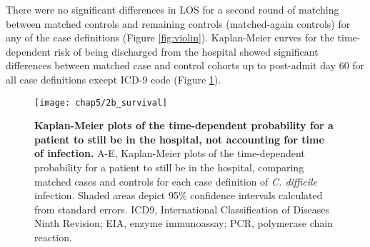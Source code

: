 There were no significant differences in LOS for a second round of matching between matched controls and remaining controls (matched-again controls) for any of the case definitions (Figure \ref{fig:violin}). Kaplan-Meier curves for the time-dependent risk of being discharged from the hospital showed significant differences between matched case and control cohorts up to post-admit day 60 for all case definitions except ICD-9 code (Figure \ref{fig:survival}).

\begin{figure}[htb]
  \texttt{[image: chap5/2b\_survival]}
  \caption[Kaplan-Meier plots for length of stay, not accounting for time of infection]{
    \textbf{Kaplan-Meier plots of the time-dependent probability for a patient to still be in the hospital, not accounting for time of infection.} A-E, Kaplan-Meier plots of the time-dependent probability for a patient to still be in the hospital, comparing matched cases and controls for each case definition of \emph{C. difficile} infection. Shaded areas depict 95\% confidence intervals calculated from standard errors. ICD9, International Classification of Diseases Ninth Revision; EIA, enzyme immunoassay; PCR, polymerase chain reaction.
  }
  \label{fig:survival}
\end{figure}

